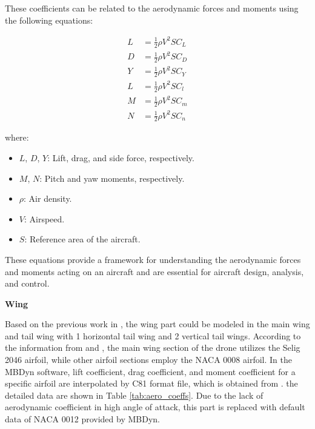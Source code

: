 These coefficients can be related to the aerodynamic forces and moments using the following equations:

\begin{align}
    L &= \frac{1}{2} \rho V^2 S C_L \\
    D &= \frac{1}{2} \rho V^2 S C_D \\
    Y &= \frac{1}{2} \rho V^2 S C_Y \\
    L &= \frac{1}{2} \rho V^2 S C_l \\
    M &= \frac{1}{2} \rho V^2 S C_m \\
    N &= \frac{1}{2} \rho V^2 S C_n
\end{align}

where:
\begin{itemize}
    \item $L$, $D$, $Y$: Lift, drag, and side force, respectively.
    \item $M$, $N$: Pitch and yaw moments, respectively.
    \item $\rho$: Air density.
    \item $V$: Airspeed.
    \item $S$: Reference area of the aircraft.
\end{itemize}

These equations provide a framework for understanding the aerodynamic forces and moments acting on an aircraft and are essential for aircraft design, analysis, and control.

\textbf{Wing}

Based on the previous work in \cite{battaini2022}, the wing part could be modeled in the main wing and tail wing with 1 horizontal tail wing and 2 vertical tail wings. According to the information from \cite{martello2021} and \cite{battaini2022}, the main wing section of the drone utilizes the Selig 2046 airfoil, while other airfoil sections employ the NACA 0008 airfoil. In the MBDyn software, lift coefficient, drag coefficient, and moment coefficient for a specific airfoil are interpolated by C81 format file, which is obtained from \cite{airfoiltools}.
the detailed data \cite{airfoiltools} are shown in Table \ref{tab:aero_coeffs}. Due to the lack of aerodynamic coefficient in high angle of attack, this part is replaced with default data of NACA 0012 provided by MBDyn.


